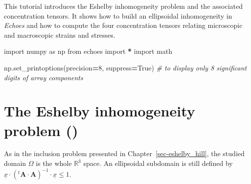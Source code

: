 \documentclass[
  a4paper,
  numbers=noendperiod,
  DIV=12]{scrreprt}
\newenvironment{Shaded}{\begin{snugshade}}{\end{snugshade}}
\newcommand{\CommentTok}[1]{\textcolor[rgb]{0.56,0.35,0.01}{\textit{#1}}}
\newcommand{\DecValTok}[1]{\textcolor[rgb]{0.00,0.00,0.81}{#1}}
\newcommand{\ImportTok}[1]{#1}
\newcommand{\NormalTok}[1]{#1}
\newcommand{\OperatorTok}[1]{\textcolor[rgb]{0.81,0.36,0.00}{\textbf{#1}}}
\newcommand{\VariableTok}[1]{\textcolor[rgb]{0.00,0.00,0.00}{#1}}
\newcommand{\R}{{\mathbb{{R}}}}
\newcommand{\uu}[1]{{\symbf{{#1}}}}
\newcommand{\uv}[1]{{\underline{{#1}}}}
\newcommand{\trans}[1]{{{}^{t}{#1}}}
\begin{document}
\begin{tcolorbox}[enhanced jigsaw, arc=.35mm, bottomrule=.15mm, bottomtitle=1mm, breakable, colback=white, colbacktitle=quarto-callout-important-color!10!white, colframe=quarto-callout-important-color-frame, coltitle=black, left=2mm, leftrule=.75mm, opacityback=0, opacitybacktitle=0.6, rightrule=.15mm, title={Objectives}, titlerule=0mm, toprule=.15mm, toptitle=1mm]

This tutorial introduces the Eshelby inhomogeneity problem and the
associated concentration tensors. It shows how to build an ellipsoidal
inhomogeneity in \emph{Echoes} and how to compute the four concentration
tensors relating microscopic and macroscopic strains and stresses.

\end{tcolorbox}

\begin{tcolorbox}[enhanced jigsaw, arc=.35mm, bottomrule=.15mm, bottomtitle=1mm, breakable, colback=white, colbacktitle=quarto-callout-tip-color!10!white, colframe=quarto-callout-tip-color-frame, coltitle=black, left=2mm, leftrule=.75mm, opacityback=0, opacitybacktitle=0.6, rightrule=.15mm, title={Imports}, titlerule=0mm, toprule=.15mm, toptitle=1mm]

\begin{Shaded}
\begin{Highlighting}[]
\ImportTok{import}\NormalTok{ numpy }\ImportTok{as}\NormalTok{ np}
\ImportTok{from}\NormalTok{ echoes }\ImportTok{import} \OperatorTok{*}
\ImportTok{import}\NormalTok{ math}

\NormalTok{np.set\_printoptions(precision}\OperatorTok{=}\DecValTok{8}\NormalTok{, suppress}\OperatorTok{=}\VariableTok{True}\NormalTok{)}
\CommentTok{\# to display only 8 significant digits of array components}
\end{Highlighting}
\end{Shaded}

\end{tcolorbox}

\section{\texorpdfstring{The Eshelby inhomogeneity problem
()}{The Eshelby inhomogeneity problem (Eshelby, 1957)}}\label{the-eshelby-inhomogeneity-problem-eshelby1957}

As in the inclusion problem presented in Chapter~\ref{sec-eshelby_hill},
the studied domain \(\Omega\) is the whole \(\R^3\) space. An
ellipsoidal subdomain is still defined by
\(\uv{x}\cdot(\trans{\uu{A}}\cdot\uu{A})^{-1}\cdot\uv{x}\leq 1\).
\end{document}
